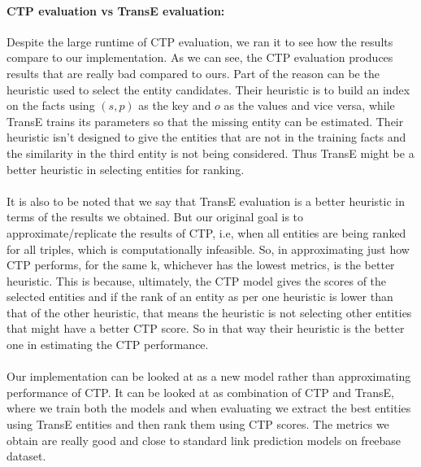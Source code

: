 \documentclass[Other]{iitddiss}
\begin{document}
\paragraph{CTP evaluation vs TransE evaluation:}
Despite the large runtime of CTP evaluation, we ran it to see how the results compare to our implementation. As we can see, the CTP evaluation produces results that are really bad compared to ours. Part of the reason can be the heuristic used to select the entity candidates. Their heuristic is to build an index on the facts using \((s, p)\) as the key and \(o\) as the values and vice versa, while TransE trains its parameters so that the missing entity can be estimated. Their heuristic isn't designed to give the entities that are not in the training facts and the similarity in the third entity is not being considered. Thus TransE might be a better heuristic in selecting entities for ranking.

\paragraph{}
It is also to be noted that we say that TransE evaluation is a better heuristic in terms of the results we obtained. But our original goal is to approximate/replicate the results of CTP, i.e, when all entities are being ranked for all triples, which is computationally infeasible. So, in approximating just how CTP performs, for the same k, whichever has the lowest metrics, is the better heuristic. This is because, ultimately, the CTP model gives the scores of the selected entities and if the rank of an entity as per one heuristic is lower than that of the other heuristic, that means the heuristic is not selecting other entities that might have a better CTP score. So in that way their heuristic is the better one in estimating the CTP performance.

\paragraph{}
Our implementation can be looked at as a new model rather than approximating performance of CTP. It can be looked at as combination of CTP and TransE, where we train both the models and when evaluating we extract the best entities using TransE entities and then rank them using CTP scores. The metrics we obtain are really good and close to standard link prediction models on freebase dataset.
\end{document}
